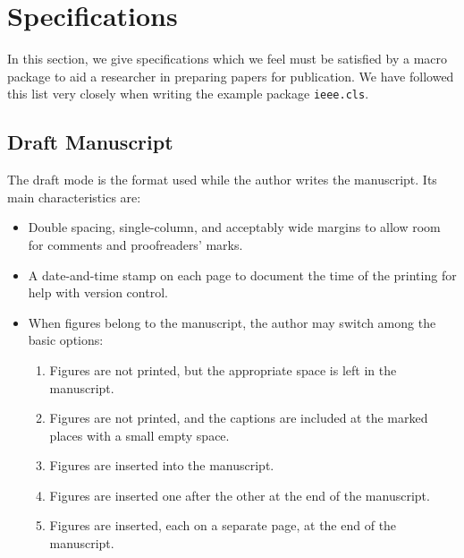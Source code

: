 \documentclass[%
	final,
	notitlepage,
	narroweqnarray,
	inline,
	twoside,
	]{ieee}
\begin{document}
\section{Specifications}

In this section, we give specifications which we feel must be
satisfied by a macro package to aid a researcher in preparing papers
for publication. We have followed this list very closely when writing
the example package \texttt{ieee.cls}.

\subsection{Draft Manuscript}

The draft mode is the format used while the author writes the manuscript. 
Its main characteristics are:
\begin{itemize}
\item Double spacing, single-column, and acceptably wide margins 
      to allow room for comments and proofreaders' marks.
\item A date-and-time stamp on each page to document the time of the
      printing for help with version control.
\item When figures belong to the manuscript, the author may switch
      among the basic options:
      \begin{enumerate}
      \item Figures are not printed, but the appropriate space is
            left in the manuscript.
      \item Figures are not printed, and the captions are
            included at the marked places with a small empty space.
      \item Figures are inserted into the manuscript.
      \item Figures are inserted one after the other at the end of the
            manuscript. 
      \item Figures are inserted, each on a separate page, at the end of the
            manuscript. 
      \end{enumerate}
\end{itemize}

\end{document}
